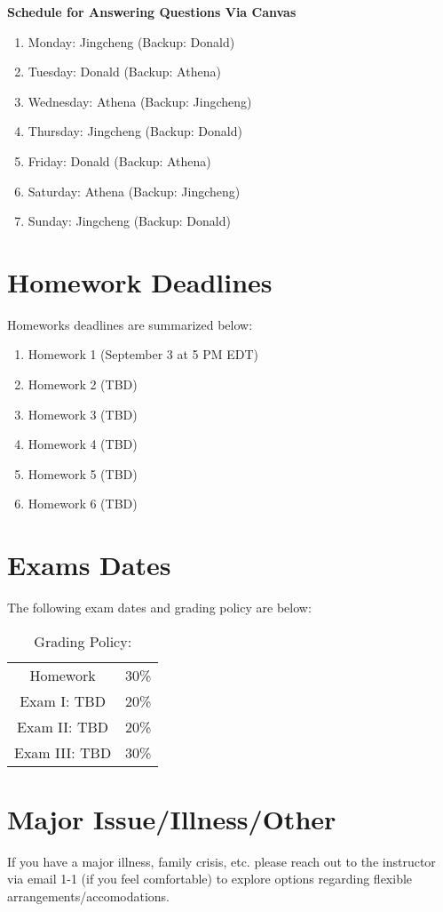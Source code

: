 \documentclass[11pt]{article}
\begin{document}
\textbf{Schedule for Answering Questions Via Canvas}
\begin{enumerate}
\item Monday: Jingcheng (Backup: Donald)
\item Tuesday: Donald (Backup: Athena)
\item Wednesday: Athena (Backup: Jingcheng)
\item Thursday: Jingcheng (Backup: Donald)
\item Friday: Donald (Backup: Athena)
\item Saturday: Athena (Backup: Jingcheng)
\item Sunday: Jingcheng (Backup: Donald)
\end{enumerate}



\section{Homework Deadlines}
Homeworks deadlines are summarized below:

\begin{enumerate}
\item Homework 1 (September 3 at 5 PM EDT)
\item Homework 2 (TBD)
\item Homework 3 (TBD)
\item Homework 4 (TBD)
\item Homework 5 (TBD)
\item Homework 6 (TBD)
\end{enumerate} 


\section{Exams Dates} 
The following exam dates and grading policy are below:

\begin{table}[h!]
\caption{Grading Policy:}
\begin{center}
\begin{tabular}{cc}
Homework &30\%\\
Exam I:  TBD &20\%\\
Exam  II: TBD & 20\%\\
Exam III:  TBD & 30\%\\
\end{tabular}
\end{center}
\label{default}
\end{table}%

\section{Major Issue/Illness/Other}

If you have a major illness, family crisis, etc. please reach out to the instructor via email 1-1 (if you feel comfortable) to explore options regarding flexible arrangements/accomodations.
\end{document}
